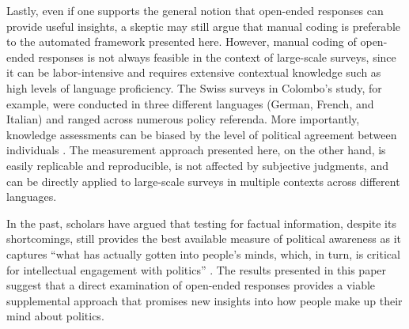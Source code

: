 Lastly, even if one supports the general notion that open-ended responses can provide useful insights, a skeptic may still argue that manual coding is preferable to the automated framework presented here. However, manual coding of open-ended responses is not always feasible in the context of large-scale surveys, since it can be labor-intensive and requires extensive contextual knowledge such as high levels of language proficiency. The Swiss surveys in Colombo's \citeyearpar{colombo2016justifications} study, for example, were conducted in three different languages (German, French, and Italian) and ranged across numerous policy referenda. More importantly, knowledge assessments can be biased by the level of political agreement between individuals \citep[e.g.,][]{ryan2011accuracy}. The measurement approach presented here, on the other hand, is easily replicable and reproducible, is not affected by subjective judgments, and can be directly applied to large-scale surveys in multiple contexts across different languages.

In the past, scholars have argued that testing for factual information, despite its shortcomings, still provides the best available measure of political awareness as it captures ``what has actually gotten into people's minds, which, in turn, is critical for intellectual engagement with politics'' \citet[21]{zaller1992nature}. The results presented in this paper suggest that a direct examination of open-ended responses provides a viable supplemental approach that promises new insights into how people make up their mind about politics.

